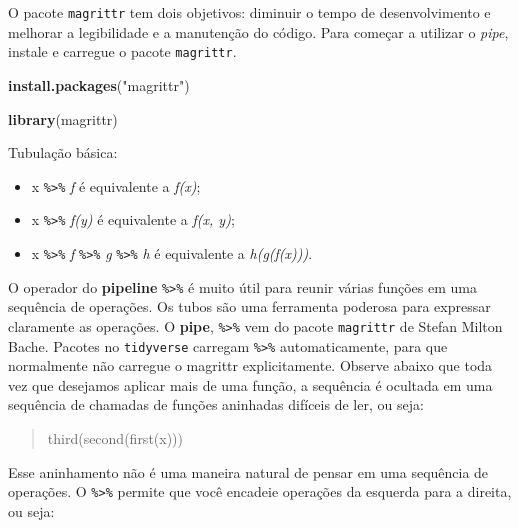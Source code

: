 \documentclass[]{book}
\newenvironment{Shaded}{\begin{snugshade}}{\end{snugshade}}
\newcommand{\KeywordTok}[1]{\textcolor[rgb]{0.13,0.29,0.53}{\textbf{#1}}}
\newcommand{\NormalTok}[1]{#1}
\newcommand{\StringTok}[1]{\textcolor[rgb]{0.31,0.60,0.02}{#1}}
\providecommand{\tightlist}{%
  \setlength{\itemsep}{0pt}\setlength{\parskip}{0pt}}
\begin{document}
O pacote \texttt{magrittr} tem dois objetivos: diminuir o tempo de desenvolvimento e melhorar a legibilidade e a manutenção do código. Para começar a utilizar o \emph{pipe}, instale e carregue o pacote \texttt{magrittr}.

\begin{Shaded}
\begin{Highlighting}[]
\KeywordTok{install.packages}\NormalTok{(}\StringTok{"magrittr"}\NormalTok{)}
\end{Highlighting}
\end{Shaded}

\begin{Shaded}
\begin{Highlighting}[]
\KeywordTok{library}\NormalTok{(magrittr)}
\end{Highlighting}
\end{Shaded}

Tubulação básica:

\begin{itemize}
\tightlist
\item
  x \texttt{\%\textgreater{}\%} \emph{f} é equivalente a \emph{f(x)};
\item
  x \texttt{\%\textgreater{}\%} \emph{f(y)} é equivalente a \emph{f(x, y)};
\item
  x \texttt{\%\textgreater{}\%} \emph{f} \texttt{\%\textgreater{}\%} \emph{g} \texttt{\%\textgreater{}\%} \emph{h} é equivalente a \emph{h(g(f(x)))}.
\end{itemize}

O operador do \textbf{pipeline} \texttt{\%\textgreater{}\%} é muito útil para reunir várias funções em uma sequência de operações. Os tubos são uma ferramenta poderosa para expressar claramente as operações. O \textbf{pipe}, \texttt{\%\textgreater{}\%} vem do pacote \texttt{magrittr} de Stefan Milton Bache. Pacotes no \texttt{tidyverse} carregam \texttt{\%\textgreater{}\%} automaticamente, para que normalmente não carregue o magrittr explicitamente. Observe abaixo que toda vez que desejamos aplicar mais de uma função, a sequência é ocultada em uma sequência de chamadas de funções aninhadas difíceis de ler, ou seja:

\begin{quote}
third(second(first(x)))
\end{quote}

Esse aninhamento não é uma maneira natural de pensar em uma sequência de operações. O \texttt{\%\textgreater{}\%} permite que você encadeie operações da esquerda para a direita, ou seja:
\end{document}
